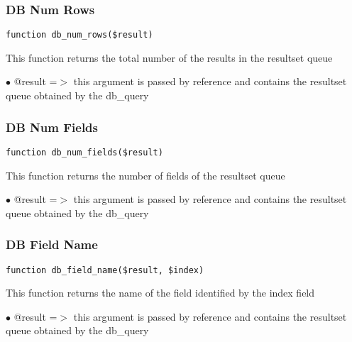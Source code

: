 \documentclass[a4paper]{article}
\begin{document}
\hypertarget{toc90}{}
\subsubsection{DB Num Rows}

\begin{lstlisting}
function db_num_rows($result)
\end{lstlisting}

This function returns the total number of the results in the resultset queue

\begin{compactitem}
\item[\color{myblue}$\bullet$] @result =$>$ this argument is passed by reference and contains the resultset queue
           obtained by the db\_query
\end{compactitem}

\hypertarget{toc91}{}
\subsubsection{DB Num Fields}

\begin{lstlisting}
function db_num_fields($result)
\end{lstlisting}

This function returns the number of fields of the resultset queue

\begin{compactitem}
\item[\color{myblue}$\bullet$] @result =$>$ this argument is passed by reference and contains the resultset queue
           obtained by the db\_query
\end{compactitem}

\hypertarget{toc92}{}
\subsubsection{DB Field Name}

\begin{lstlisting}
function db_field_name($result, $index)
\end{lstlisting}

This function returns the name of the field identified by the index field

\begin{compactitem}
\item[\color{myblue}$\bullet$] @result =$>$ this argument is passed by reference and contains the resultset queue
           obtained by the db\_query
\end{compactitem}
\end{document}
